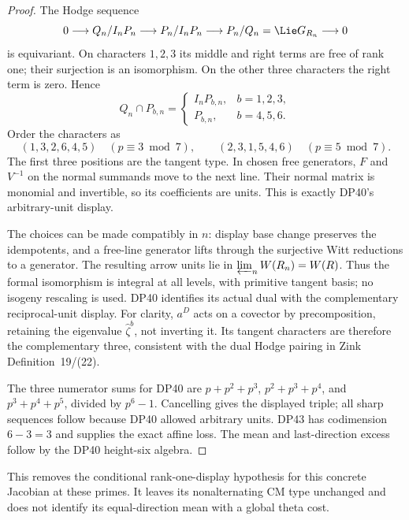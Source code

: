 \begin{proof}
The Hodge sequence
\[
 0\longrightarrow Q_n/I_nP_n\longrightarrow P_n/I_nP_n
       \longrightarrow P_n/Q_n=\Lie G_{R_n}\longrightarrow0
\]
is equivariant. On characters $1,2,3$ its middle and right terms are free of rank one; their surjection is an isomorphism. On the other three characters the right term is zero. Hence
\[
 Q_n\cap P_{b,n}=
 \begin{cases}I_nP_{b,n},&b=1,2,3,\\P_{b,n},&b=4,5,6.\end{cases}
\]
Order the characters as
\[
 (1,3,2,6,4,5)\quad(p\equiv3\bmod7),\qquad
 (2,3,1,5,4,6)\quad(p\equiv5\bmod7).
\]
The first three positions are the tangent type. In chosen free generators, $F$ and $V^{-1}$ on the normal summands move to the next line. Their normal matrix is monomial and invertible, so its coefficients are units. This is exactly DP40's arbitrary-unit display.

The choices can be made compatibly in $n$: display base change preserves the idempotents, and a free-line generator lifts through the surjective Witt reductions to a generator. The resulting arrow units lie in
$\varprojlim_n W(R_n)=W(R)$.
Thus the formal isomorphism is integral at all levels, with primitive tangent basis; no isogeny rescaling is used.
DP40 identifies its actual dual with the complementary reciprocal-unit display. For clarity, $a^D$ acts on a covector by precomposition, retaining the eigenvalue $\widehat\zeta^b$, not inverting it. Its tangent characters are therefore the complementary three, consistent with the dual Hodge pairing in Zink Definition~19/(22).

The three numerator sums for DP40 are
$p+p^2+p^3$, $p^2+p^3+p^4$, and $p^3+p^4+p^5$, divided by $p^6-1$.
Cancelling gives the displayed triple; all sharp sequences follow because DP40 allowed arbitrary units. DP43 has codimension $6-3=3$ and supplies the exact affine loss. The mean and last-direction excess follow by the DP40 height-six algebra.
\end{proof}

This removes the conditional rank-one-display hypothesis for this concrete Jacobian at these primes. It leaves its nonalternating CM type unchanged and does not identify its equal-direction mean with a global theta cost.

